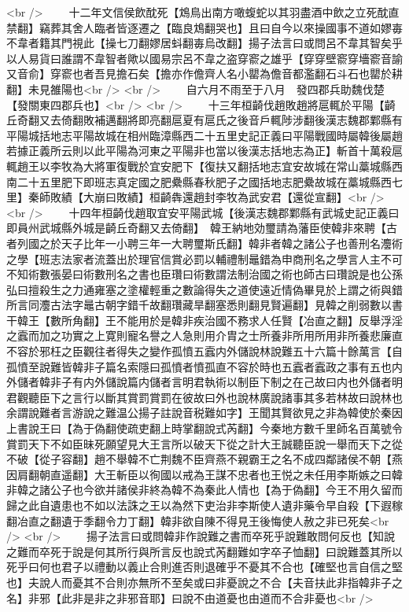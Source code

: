 <br />
　　十二年文信侯飲酖死【鴆鳥出南方噉蝮蛇以其羽盡酒中飲之立死酖直禁翻】竊葬其舍人臨者皆逐遷之【臨良鴆翻哭也】且曰自今以來操國事不道如嫪毐不韋者籍其門視此【操七刀翻嫪居蚪翻毐烏改翻】揚子法言曰或問呂不韋其智矣乎以人易貨曰誰謂不韋智者歟以國易宗呂不韋之盗穿窬之雄乎【穿穿壁窬穿墻窬音諭又音俞】穿窬也者吾見擔石矣【擔亦作儋齊人名小罌為儋音都濫翻石斗石也罌於耕翻】未見雒陽也<br />
<br />
　　自六月不雨至于八月　發四郡兵助魏伐楚【發關東四郡兵也】<br />
<br />
　　十三年桓齮伐趙敗趙將扈輒於平陽【齮丘奇翻又去倚翻敗補邁翻將即亮翻扈夏有扈氏之後音戶輒陟涉翻後漢志魏郡鄴縣有平陽城括地志平陽故城在相州臨漳縣西二十五里史記正義曰平陽戰國時屬韓後屬趙若據正義所云則以此平陽為河東之平陽非也當以後漢志括地志為正】斬首十萬殺扈輒趙王以李牧為大將軍復戰於宜安肥下【復扶又翻括地志宜安故城在常山藁城縣西南二十五里肥下即班志真定國之肥纍縣春秋肥子之國括地志肥纍故城在藁城縣西七里】秦師敗績【大崩曰敗績】桓齮犇還趙封李牧為武安君【還從宣翻】<br />
<br />
　　十四年桓齮伐趙取宜安平陽武城【後漢志魏郡鄴縣有武城史記正義曰即員州武城縣外城是齮丘奇翻又去倚翻】　韓王納地効璽請為藩臣使韓非來聘【古者列國之於天子比年一小聘三年一大聘璽斯氏翻】韓非者韓之諸公子也善刑名灋術之學【班志法家者流蓋出於理官信賞必罰以輔禮制鼂錯為申商刑名之學言人主不可不知術數張晏曰術數刑名之書也臣瓚曰術數謂法制治國之術也師古曰瓚說是也公孫弘曰擅殺生之力通雍塞之塗權輕重之數論得失之道使遠近情偽畢見於上謂之術與錯所言同灋古法字鼂古朝字錯千故翻瓚藏旱翻塞悉則翻見賢遍翻】見韓之削弱數以書干韓王【數所角翻】王不能用於是韓非疾治國不務求人任賢【冶直之翻】反舉浮淫之蠧而加之功實之上寛則寵名譽之人急則用介胄之士所養非所用所用非所養悲廉直不容於邪枉之臣觀往者得失之變作孤憤五蠧内外儲說林說難五十六篇十餘萬言【自孤憤至說難皆韓非子篇名索隱曰孤憤者憤孤直不容於時也五蠧者蠧政之事有五也内外儲者韓非子有内外儲說篇内儲者言明君執術以制臣下制之在己故曰内也外儲者明君觀聽臣下之言行以斷其賞罰賞罰在彼故曰外也說林廣說諸事其多若林故曰說林也余謂說難者言游說之難温公揚子註說音税難如字】王聞其賢欲見之非為韓使於秦因上書說王曰【為于偽翻使疏吏翻上時掌翻說式芮翻】今秦地方數千里師名百萬號令賞罰天下不如臣昧死願望見大王言所以破天下從之計大王誠聽臣說一舉而天下之從不破【從子容翻】趙不舉韓不亡荆魏不臣齊燕不親霸王之名不成四鄰諸侯不朝【燕因肩翻朝直遥翻】大王斬臣以徇國以戒為王謀不忠者也王悦之未任用李斯嫉之曰韓非韓之諸公子也今欲并諸侯非終為韓不為秦此人情也【為于偽翻】今王不用久留而歸之此自遺患也不如以法誅之王以為然下吏治非李斯使人遺非藥令早自殺【下遐稼翻冶直之翻遺于季翻令力丁翻】韓非欲自陳不得見王後悔使人赦之非已死矣<br />
<br />
　　揚子法言曰或問韓非作說難之書而卒死乎說難敢問何反也【知說之難而卒死于說是何其所行與所言反也說式芮翻難如字卒子恤翻】曰說難蓋其所以死乎曰何也君子以禮動以義止合則進否則退確乎不憂其不合也【確堅也言自信之堅也】夫說人而憂其不合則亦無所不至矣或曰非憂說之不合【夫音扶此非指韓非子之名】非邪【此非是非之非邪音耶】曰說不由道憂也由道而不合非憂也<br />

